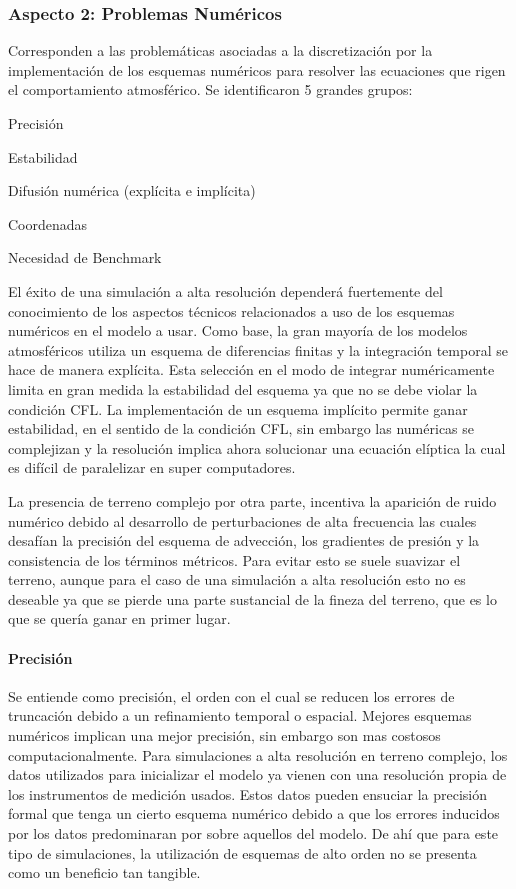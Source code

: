 \subsubsection{Aspecto 2: Problemas Numéricos}
Corresponden a las problemáticas asociadas a la discretización por la implementación de los esquemas numéricos para resolver las ecuaciones que rigen el comportamiento atmosférico. Se identificaron 5 grandes grupos:
\begin{itemize*}
	\item Precisión
	\item Estabilidad
	\item Difusión numérica (explícita e implícita)
	\item Coordenadas
	\item Necesidad de Benchmark
\end{itemize*}

El éxito de una simulación a alta resolución dependerá fuertemente del conocimiento de los aspectos técnicos relacionados a uso de los esquemas numéricos en el modelo a usar. Como base, la gran mayoría de los modelos atmosféricos utiliza un esquema de diferencias finitas y la integración temporal se hace de manera explícita. Esta selección en el modo de integrar numéricamente limita en gran medida la estabilidad del esquema ya que no se debe violar la condición CFL. La implementación de un esquema implícito permite ganar estabilidad, en el sentido de la condición CFL, sin embargo las numéricas se complejizan y la resolución implica ahora solucionar una ecuación elíptica la cual es difícil de paralelizar en super computadores.

La presencia de terreno complejo por otra parte, incentiva la aparición de ruido numérico debido al desarrollo de perturbaciones de alta frecuencia las cuales desafían la precisión del esquema de advección, los gradientes de presión y la consistencia de los términos métricos. Para evitar esto se suele suavizar el terreno, aunque para el caso de una simulación a alta resolución esto no es deseable ya que se pierde una parte sustancial de la fineza del terreno, que es lo que se quería ganar en primer lugar. 

\paragraph{Precisión} Se entiende como precisión, el orden con el cual se reducen los errores de truncación debido a un refinamiento temporal o espacial. Mejores esquemas numéricos implican una mejor precisión, sin embargo son mas costosos computacionalmente. Para simulaciones a alta resolución en terreno complejo, los datos utilizados para inicializar el modelo ya vienen con una resolución propia de los instrumentos de medición usados. Estos datos pueden ensuciar la precisión formal que tenga un cierto esquema numérico debido a que los errores inducidos por los datos predominaran por sobre aquellos del modelo. De ahí que para este tipo de simulaciones, la utilización de esquemas de alto orden no se presenta como un beneficio tan tangible.


